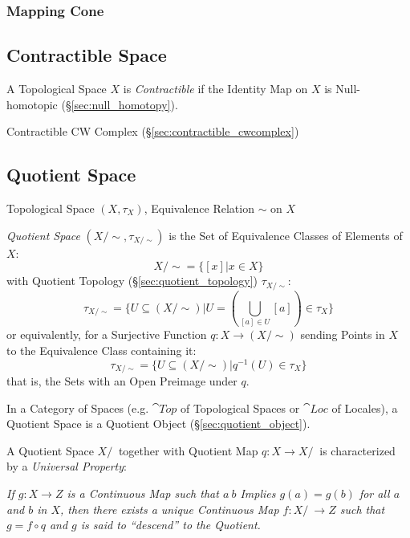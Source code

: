 \subsubsection{Mapping Cone}\label{sec:mapping_cone}



\subsection{Contractible Space}\label{sec:contractible_space}

A Topological Space $X$ is \emph{Contractible} if the Identity Map on
$X$ is Null-homotopic (\S\ref{sec:null_homotopy}).

Contractible CW Complex (\S\ref{sec:contractible_cwcomplex})



\subsection{Quotient Space}\label{sec:quotient_space}

Topological Space $(X, \tau_X)$, Equivalence Relation $\sim$ on $X$

\emph{Quotient Space} $(X/\sim, \tau_{X/\sim})$ is the Set of Equivalence
Classes of Elements of $X$:
\[
  X / \sim = \{ [x] | x \in X \}
\]
with Quotient Topology (\S\ref{sec:quotient_topology}) $\tau_{X/\sim}$:
\[
  \tau_{X/\sim} = \{ U \subseteq (X/\sim) |
    U = (\bigcup_{[a] \in U} [a]) \in \tau_X \}
\]
or equivalently, for a Surjective Function $q : X \rightarrow (X / \sim)$
sending Points in $X$ to the Equivalence Class containing it:
\[
  \tau_{X/\sim} = \{ U \subseteq (X/\sim) | q^{-1}(U) \in \tau_X \}
\]
that is, the Sets with an Open Preimage under $q$.

In a Category of Spaces (e.g. $\cat{Top}$ of Topological Spaces or $\cat{Loc}$
of Locales), a Quotient Space is a Quotient Object
(\S\ref{sec:quotient_object}).

A Quotient Space $X/~$ together with Quotient Map $q : X \rightarrow X/~$ is
characterized by a \emph{Universal Property}:

\emph{If $g : X \rightarrow Z$ is a Continuous Map such that $a ~ b$ Implies $g(a)
  = g(b)$ for all $a$ and $b$ in $X$, then there exists a unique Continuous Map
  $f : X/~ \rightarrow Z$ such that $g = f \circ q$ and $g$ is said to
  ``descend'' to the Quotient.}



